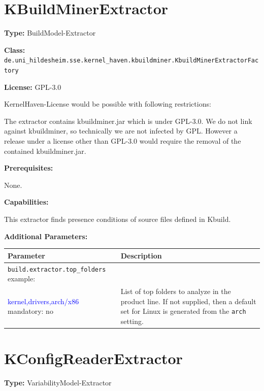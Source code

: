 \section{KBuildMinerExtractor}

\textbf{Type:}
BuildModel-Extractor

\textbf{Class:} \texttt                             {de.uni\_hildesheim.sse.kernel\_haven.kbuildminer.KbuildMinerExtractorFactory}

\textbf{License:}
GPL-3.0 

KernelHaven-License would be possible with following restrictions:

The extractor contains kbuildminer.jar which is under GPL-3.0. We do not link against kbuildminer, so technically we are not infected by GPL. However a release under a license other than GPL-3.0 would require the removal of the contained kbuildminer.jar.

\textbf{Prerequisites:}

None.

\textbf{Capabilities:}

This extractor finds presence conditions of source files defined in Kbuild.

\textbf{Additional Parameters:}

\begin{table}[h!] %
    \begin{tabularx}{\textwidth}{|p{}|p{}|}\hline
        \textbf{Parameter} & \textbf{Description} \\ \hline \hline
        
        \texttt{build.extractor.top\_folders} \newline example: \\ \textcolor{blue}{kernel,drivers,arch/x86}  \newline mandatory: no & List of top folders to analyze in the product line. If not supplied, then a default set for Linux is generated from the \texttt{arch} setting. \\ \hline
        
    \end{tabularx}
\end{table}


\section{KConfigReaderExtractor}

\textbf{Type:} VariabilityModel-Extractor

